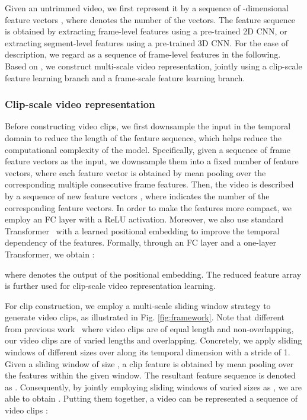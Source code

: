 \documentclass[sigconf]{acmart}
\begin{document}
Given an untrimmed video, we first represent it by a sequence of -dimensional feature vectors , where  denotes the number of the vectors.
The feature sequence is obtained by extracting frame-level features using a pre-trained 2D CNN, or extracting segment-level features using a pre-trained 3D CNN.
For the ease of description, we regard  as a sequence of frame-level features in the following.
Based on , we construct multi-scale video representation, jointly using a clip-scale feature learning branch and a frame-scale feature learning branch.



\subsubsection{Clip-scale video representation}
Before constructing video clips, we first downsample the input in the temporal domain to reduce the length of the feature sequence, which helps reduce the computational complexity of the model.
Specifically, given a sequence of frame feature vectors  as the input, we downsample them into a fixed number of feature vectors, where each feature vector is obtained by mean pooling over the corresponding multiple consecutive frame features.
Then, the video is described by a sequence of new feature vectors , where  indicates the number of the corresponding feature vectors.
In order to make the features more compact, we employ an FC layer with a ReLU activation.
Moreover, we also use standard Transformer~\cite{vaswani2017attention} with a learned positional embedding to improve the temporal dependency of the features.
Formally, through an FC layer and a one-layer Transformer, we obtain :

where  denotes the output of the positional embedding. The reduced feature array  is further used for clip-scale  video representation learning. 


For clip construction, we employ a multi-scale sliding window strategy to generate video clips, as illustrated in Fig. \ref{fig:framework}.
Note that different from previous work~\cite{zhang2020hierarchical} where video clips are of equal length and non-overlapping, our video clips are of varied lengths and overlapping.
Concretely, we apply sliding windows of different sizes over   along its temporal dimension with a stride of 1. 
Given a sliding window of size , a clip feature is obtained by mean pooling over the features within the given window. The resultant feature sequence is denoted as .
Consequently, by jointly employing sliding windows of varied sizes as , we are able to obtain . 
Putting them together, a video can be represented a sequence of video clips :
\end{document}
